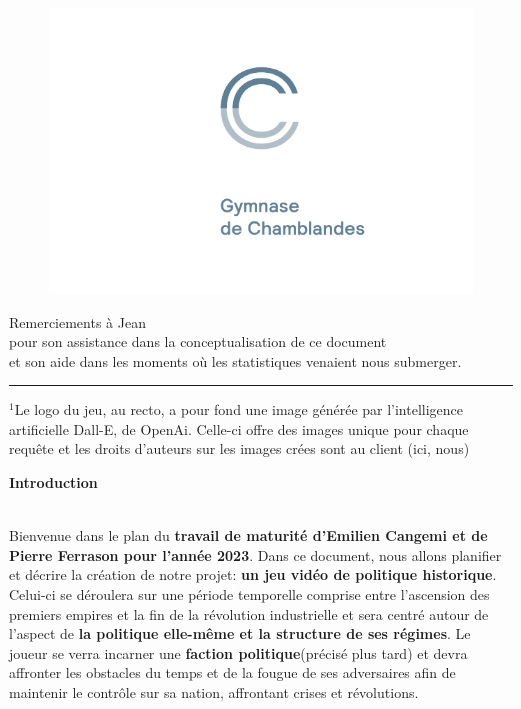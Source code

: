 \documentclass{article}
\begin{document}
\begin{center}
    \begin{figure}[h]
        \centering
            \includegraphics[scale=0.2]{logo.png}
    \end{figure}
\end{center}

\pagebreak

\vspace*{\fill}
\begin{center}
    \large  
    Remerciements à Jean\\ pour son assistance dans la conceptualisation de ce document \\et son aide dans les moments où les statistiques venaient nous submerger. \\
\end{center}
\vspace*{\fill}
%
\par\noindent\rule{\textwidth}{0.4pt}
{\footnotesize $^{1}$Le logo du jeu, au recto, a pour fond une image générée par l'intelligence artificielle Dall-E, de OpenAi. Celle-ci offre des images unique pour chaque requête et les droits d'auteurs sur les images crées sont au client (ici, nous)}


\pagebreak

\small

\tableofcontents

\pagebreak

\Large \textbf{ Introduction} \\ \\
\large

Bienvenue dans le plan du \textbf{travail de maturité d'Emilien Cangemi et de Pierre Ferrason pour l'année 2023}. Dans ce document, nous allons planifier et décrire la création de notre projet: \textbf{un jeu vidéo de politique historique}. Celui-ci se déroulera sur une période temporelle comprise entre l'ascension des premiers empires et la fin de la révolution industrielle et sera centré autour de l'aspect de \textbf{la politique elle-même et la structure de ses régimes}. Le joueur se verra incarner une \textbf{faction politique}(précisé plus tard) et devra affronter les obstacles du temps et de la fougue de ses adversaires afin de maintenir le contrôle sur sa nation, affrontant crises et révolutions.
\end{document}
